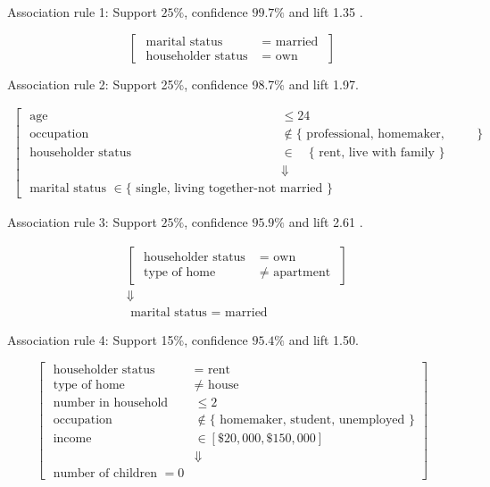\documentclass[10pt]{article}
\begin{document}
Association rule 1: Support $25 \%$, confidence $99.7 \%$ and lift 1.35 .

$$
\left[\begin{array}{rl}
\text { marital status } & =\text { married } \\
\text { householder status } & =\text { own }
\end{array}\right]
$$

Association rule 2: Support 25\%, confidence 98.7\% and lift 1.97.

$$
\begin{aligned}
{\left[\begin{array}{rl}
\text { age } & \leq 24 \\
\text { occupation } & \notin\{\text { professional, homemaker, retired }\} \\
\text { householder status } & \in \quad\{\text { rent, live with family }\} \\
& \Downarrow \\
\text { marital status } \in\{\text { single, living together-not married }\}
\end{array}\right.}
\end{aligned}
$$

Association rule 3: Support $25 \%$, confidence $95.9 \%$ and lift 2.61 .

$$
\begin{aligned}
& {\left[\begin{array}{rl}
\text { householder status } & =\text { own } \\
\text { type of home } & \neq \text { apartment }
\end{array}\right] } \\
& \Downarrow \\
& \text { marital status }=\text { married }
\end{aligned}
$$

Association rule 4: Support 15\%, confidence $95.4 \%$ and lift 1.50.

$$
\left[\begin{array}{rl}
\text { householder status } & =\text { rent } \\
\text { type of home } & \neq \text { house } \\
\text { number in household } & \leq 2 \\
\text { occupation } & \notin\{\text { homemaker, student, unemployed }\} \\
\text { income } & \in[\$ 20,000, \$ 150,000] \\
& \Downarrow \\
\text { number of children }=0
\end{array}\right]
$$
\end{document}
